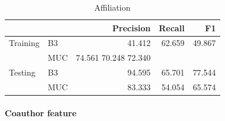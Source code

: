 \documentclass[twocolumn,letterpaper]{article}
\begin{document}
\begin{table}[ht]
\centering
\begin{tabular}{l || l | r r r}
 & & Precision & Recall & F1 \\ \hline
Training & B3 & 41.412 & 62.659 & 49.867 \\
 & MUC & 74.561 70.248 72.340\\ \hline
Testing & B3 & 94.595 & 65.701 & 77.544 \\
 & MUC & 83.333 & 54.054 & 65.574 \\
\end{tabular}
\caption{Affiliation}
\label{tab:aff}
\end{table}

\paragraph{Coauthor feature} %
\label{par:coauthor_feature}





\end{document}
